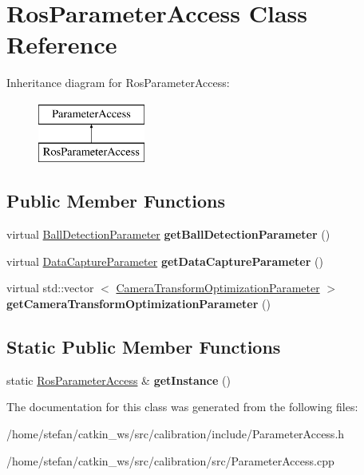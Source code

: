 \hypertarget{classRosParameterAccess}{\section{\-Ros\-Parameter\-Access \-Class \-Reference}
\label{classRosParameterAccess}
}
\-Inheritance diagram for \-Ros\-Parameter\-Access\-:\begin{figure}[H]
\begin{center}
\leavevmode
\includegraphics[height=2.000000cm]{classRosParameterAccess}
\end{center}
\end{figure}
\subsection*{\-Public \-Member \-Functions}
\begin{DoxyCompactItemize}
\item 
\hypertarget{classRosParameterAccess_aeed78ae357b863caf91a9065cbcf85ad}{virtual \hyperlink{classBallDetectionParameter}{\-Ball\-Detection\-Parameter} {\bfseries get\-Ball\-Detection\-Parameter} ()}\label{classRosParameterAccess_aeed78ae357b863caf91a9065cbcf85ad}

\item 
\hypertarget{classRosParameterAccess_a556f2a0983a33f1f03b564985082f144}{virtual \hyperlink{classDataCaptureParameter}{\-Data\-Capture\-Parameter} {\bfseries get\-Data\-Capture\-Parameter} ()}\label{classRosParameterAccess_a556f2a0983a33f1f03b564985082f144}

\item 
\hypertarget{classRosParameterAccess_a0c93727c44a5b85de35f62610e6d30a1}{virtual std\-::vector\*
$<$ \hyperlink{classCameraTransformOptimizationParameter}{\-Camera\-Transform\-Optimization\-Parameter} $>$ {\bfseries get\-Camera\-Transform\-Optimization\-Parameter} ()}\label{classRosParameterAccess_a0c93727c44a5b85de35f62610e6d30a1}

\end{DoxyCompactItemize}
\subsection*{\-Static \-Public \-Member \-Functions}
\begin{DoxyCompactItemize}
\item 
\hypertarget{classRosParameterAccess_a6e39677fa574dda712bc2eb7a19a65fb}{static \hyperlink{classRosParameterAccess}{\-Ros\-Parameter\-Access} \& {\bfseries get\-Instance} ()}\label{classRosParameterAccess_a6e39677fa574dda712bc2eb7a19a65fb}

\end{DoxyCompactItemize}


\-The documentation for this class was generated from the following files\-:\begin{DoxyCompactItemize}
\item 
/home/stefan/catkin\-\_\-ws/src/calibration/include/\-Parameter\-Access.\-h\item 
/home/stefan/catkin\-\_\-ws/src/calibration/src/\-Parameter\-Access.\-cpp\end{DoxyCompactItemize}
